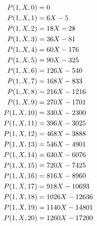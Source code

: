 ﻿\begin{align*}
    {P}(1,X,0) &= 0 \\
    {P}(1,X,1) &= 6X - 5 \\
    {P}(1,X,2) &= 18X - 28 \\
    {P}(1,X,3) &= 36X - 81 \\
    {P}(1,X,4) &= 60X - 176 \\
    {P}(1,X,5) &= 90X - 325 \\
    {P}(1,X,6) &= 126X - 540 \\
    {P}(1,X,7) &= 168X - 833 \\
    {P}(1,X,8) &= 216X - 1216 \\
    {P}(1,X,9) &= 270X - 1701 \\
    {P}(1,X,10) &= 330X - 2300 \\
    {P}(1,X,11) &= 396X - 3025 \\
    {P}(1,X,12) &= 468X - 3888 \\
    {P}(1,X,13) &= 546X - 4901 \\
    {P}(1,X,14) &= 630X - 6076 \\
    {P}(1,X,15) &= 720X - 7425 \\
    {P}(1,X,16) &= 816X - 8960 \\
    {P}(1,X,17) &= 918X - 10693 \\
    {P}(1,X,18) &= 1026X - 12636 \\
    {P}(1,X,19) &= 1140X - 14801 \\
    {P}(1,X,20) &= 1260X - 17200
\end{align*}
